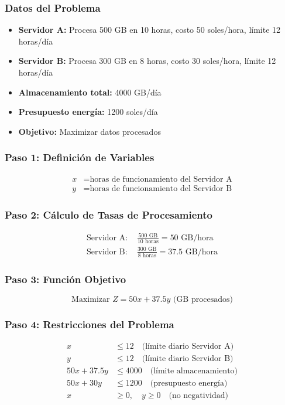 \documentclass[12pt]{article}
\begin{document}
	\subsubsection*{Datos del Problema}
	\begin{itemize}
		\item \textbf{Servidor A:} Procesa 500 GB en 10 horas, costo 50 soles/hora, límite 12 horas/día
		\item \textbf{Servidor B:} Procesa 300 GB en 8 horas, costo 30 soles/hora, límite 12 horas/día
		\item \textbf{Almacenamiento total:} 4000 GB/día
		\item \textbf{Presupuesto energía:} 1200 soles/día
		\item \textbf{Objetivo:} Maximizar datos procesados
	\end{itemize}
	
	\subsubsection*{Paso 1: Definición de Variables}
	\begin{align}
		x &= \text{horas de funcionamiento del Servidor A}\\
		y &= \text{horas de funcionamiento del Servidor B}
	\end{align}
	
	\subsubsection*{Paso 2: Cálculo de Tasas de Procesamiento}
	\begin{align}
		\text{Servidor A: } &\frac{500 \text{ GB}}{10 \text{ horas}} = 50 \text{ GB/hora}\\
		\text{Servidor B: } &\frac{300 \text{ GB}}{8 \text{ horas}} = 37.5 \text{ GB/hora}
	\end{align}
	
	\subsubsection*{Paso 3: Función Objetivo}
	\begin{equation}
		\boxed{\text{Maximizar } Z = 50x + 37.5y \text{ (GB procesados)}}
	\end{equation}
	
	\subsubsection*{Paso 4: Restricciones del Problema}
	\begin{align}
		x &\leq 12 \quad \text{(límite diario Servidor A)}\\
		y &\leq 12 \quad \text{(límite diario Servidor B)}\\
		50x + 37.5y &\leq 4000 \quad \text{(límite almacenamiento)}\\
		50x + 30y &\leq 1200 \quad \text{(presupuesto energía)}\\
		x &\geq 0, \quad y \geq 0 \quad \text{(no negatividad)}
	\end{align}
	
\end{document}

